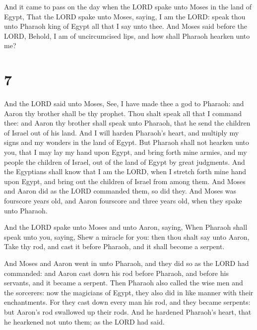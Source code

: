 And it came to pass on the day when the LORD spake unto
Moses in the land of Egypt,  That the LORD spake unto
Moses, saying, I am the LORD: speak thou unto Pharaoh king of Egypt all
that I say unto thee.  And Moses said before the LORD,
Behold, I am of uncircumcised lips, and how shall Pharaoh hearken unto
me?

\hypertarget{section-6}{%
\section{7}\label{section-6}}

 And the LORD said unto Moses, See, I have made thee a god
to Pharaoh: and Aaron thy brother shall be thy prophet. 
Thou shalt speak all that I command thee: and Aaron thy brother shall
speak unto Pharaoh, that he send the children of Israel out of his land.
 And I will harden Pharaoh's heart, and multiply my signs
and my wonders in the land of Egypt.  But Pharaoh shall not
hearken unto you, that I may lay my hand upon Egypt, and bring forth
mine armies, and my people the children of Israel, out of the land of
Egypt by great judgments.  And the Egyptians shall know that
I am the LORD, when I stretch forth mine hand upon Egypt, and bring out
the children of Israel from among them.  And Moses and Aaron
did as the LORD commanded them, so did they.  And Moses was
fourscore years old, and Aaron fourscore and three years old, when they
spake unto Pharaoh.

 And the LORD spake unto Moses and unto Aaron, saying,
 When Pharaoh shall speak unto you, saying, Shew a miracle
for you: then thou shalt say unto Aaron, Take thy rod, and cast it
before Pharaoh, and it shall become a serpent.

 And Moses and Aaron went in unto Pharaoh, and they did
so as the LORD had commanded: and Aaron cast down his rod before
Pharaoh, and before his servants, and it became a serpent. 
Then Pharaoh also called the wise men and the sorcerers: now the
magicians of Egypt, they also did in like manner with their
enchantments.  For they cast down every man his rod, and
they became serpents: but Aaron's rod swallowed up their rods.
 And he hardened Pharaoh's heart, that he hearkened not
unto them; as the LORD had said.

